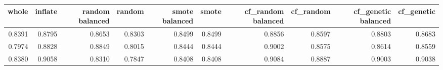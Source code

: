 \begin{tabular}{rrrrrrrrrr}
\toprule

 whole &  inflate &  random balanced &  random &  smote balanced &  smote &  cf\_random balanced &  cf\_random &  cf\_genetic balanced &  cf\_genetic \\
\midrule

0.8391 &   0.8795 &           0.8653 &  0.8303 &          0.8499 & 0.8499 &              0.8856 &     0.8597 &               0.8803 &      0.8683 \\
0.7974 &   0.8828 &           0.8849 &  0.8015 &          0.8444 & 0.8444 &              0.9002 &     0.8575 &               0.8614 &      0.8559 \\
0.8380 &   0.9058 &           0.8310 &  0.7847 &          0.8408 & 0.8408 &              0.9084 &     0.8887 &               0.9003 &      0.9038 \\

\bottomrule
\end{tabular}

